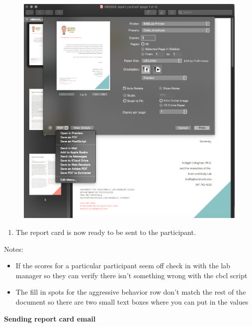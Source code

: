 \documentclass[]{book}
\providecommand{\tightlist}{%
  \setlength{\itemsep}{0pt}\setlength{\parskip}{0pt}}
\begin{document}
\begin{figure}
\centering
\includegraphics{images/report_card_online/6.png}
\caption{}
\end{figure}

\begin{enumerate}
\def\labelenumi{\arabic{enumi}.}
\setcounter{enumi}{7}
\tightlist
\item
  The report card is now ready to be sent to the participant.
\end{enumerate}

Notes:

\begin{itemize}
\item
  If the scores for a particular participant seem off check in with the lab manager so they can verify there isn't something wrong with the cbcl script
\item
  The fill in spots for the aggressive behavior row don't match the rest of the document so there are two small text boxes where you can put in the values
\end{itemize}

\textbf{Sending report card email}
\end{document}
